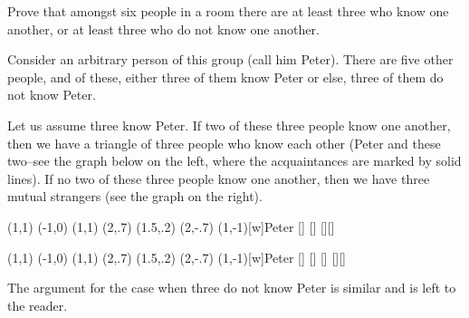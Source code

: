 \begin{exa}
\label{exa:ramsey6-2}Prove that amongst
six people in a room there are at least three who know one
another, or at least three who do not know one another.
\begin{sol}
Consider an arbitrary person of this group
(call him Peter). There are five other people, and of these,
either three of them know Peter or else, three of them do not know
Peter. 

Let us assume three know Peter.
If two of these three people know one another,
then we have a triangle of three people who know each other 
(Peter and these two--see the graph below on the left, 
where the acquaintances are marked by solid
lines). If no two of these three people know one another, then we
have three mutual strangers (see the graph on the right).

\begin{minipage}{.4\textwidth}
\centering
\begin{graph}(1,1) (-1,0) (1,1)
(2,.7) (1.5,.2) (2,-.7)
(1,-1)[w]{Peter}  
   []
[]
[][]
\end{graph}\vspace*{.5in}
\end{minipage}
\hfill
\begin{minipage}{.4\textwidth}
\centering
\begin{graph}(1,1) (-1,0) (1,1)
(2,.7) (1.5,.2) (2,-.7)
(1,-1)[w]{Peter}  
  []
[] []
[][]
\end{graph}\vspace*{.5in}
\end{minipage}

The argument for the case when three do not know Peter is similar
and is left to the reader.

\end{sol}
\end{exa}



